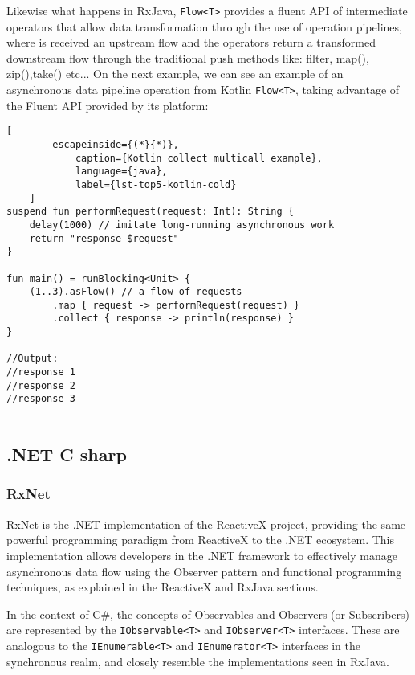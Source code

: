 Likewise what happens in RxJava, \texttt{Flow<T>} provides a fluent API of intermediate operators that allow data transformation through the use of operation pipelines, where is received an upstream  flow and the operators return a transformed downstream flow through the traditional push methods like: filter, map(), zip(),take() etc... 
On the next example, we can see an example of an asynchronous data pipeline operation from Kotlin \texttt{Flow<T>}, taking advantage of the Fluent API provided by its platform:

\begin{center}
	\lstset{basicstyle=\scriptsize\ttfamily,frame=bottomline}
	\begin{lstlisting}[
		escapeinside={(*}{*)},
			caption={Kotlin collect multicall example},
			language={java},
			label={lst-top5-kotlin-cold}
	]
suspend fun performRequest(request: Int): String {
	delay(1000) // imitate long-running asynchronous work
	return "response $request"
}

fun main() = runBlocking<Unit> {
	(1..3).asFlow() // a flow of requests
		.map { request -> performRequest(request) }
		.collect { response -> println(response) }
}

//Output:
//response 1
//response 2
//response 3
	
	\end{lstlisting}
\end{center}


\subsection {.NET C sharp}
\label{sec:csharp}


\subsubsection{RxNet}
\label{rxnet}

RxNet is the .NET implementation of the ReactiveX project, providing the same powerful programming paradigm from ReactiveX to the .NET ecosystem. This implementation allows developers in the .NET framework to effectively manage asynchronous data flow using the Observer pattern and functional programming techniques, as explained in the ReactiveX and RxJava sections.

In the context of C\#, the concepts of Observables and Observers (or Subscribers) are represented by the \texttt{IObservable<T>} and \texttt{IObserver<T>} interfaces. These are analogous to the \texttt{IEnumerable<T>} and \texttt{IEnumerator<T>} interfaces in the synchronous realm, and closely resemble the implementations seen in RxJava.

